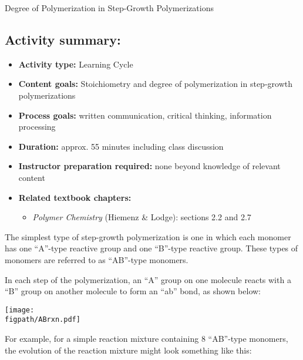 \begin{activity}{Degree of Polymerization in Step-Growth Polymerizations}
\begin{instructornotes}
	\subsection*{Activity summary:}
	\begin{itemize}
		\item \textbf{Activity type:} Learning Cycle
		\item \textbf{Content goals:} Stoichiometry and degree of polymerization in step-growth polymerizations
		\item \textbf{Process goals:} %
			written communication, critical thinking, information processing
		\item \textbf{Duration:} approx. 55 minutes including class discussion
		\item \textbf{Instructor preparation required:} none beyond knowledge of relevant content
		\item \textbf{Related textbook chapters:}
			\begin{itemize}
				\item \emph{Polymer Chemistry} (Hiemenz \& Lodge): sections 2.2 and 2.7
			\end{itemize}
	\end{itemize}

\end{instructornotes}


\begin{model}
\label{\labelbase:mdl:ABpolym}

The simplest type of step-growth polymerization is one in which each monomer has one ``A''-type reactive group and one ``B''-type reactive group.
These types of monomers are referred to as ``AB''-type monomers.

In each step of the polymerization, an ``A'' group on one molecule reacts with a ``B'' group on another molecule to form an ``ab'' bond, as shown below:

\vspace{0.1in}
\centerline{\texttt{[image: \\figpath/ABrxn.pdf]}}

For example, for a simple reaction mixture containing 8 ``AB''-type monomers, the evolution of the reaction mixture might look something like this:


\end{model}
\end{activity}
